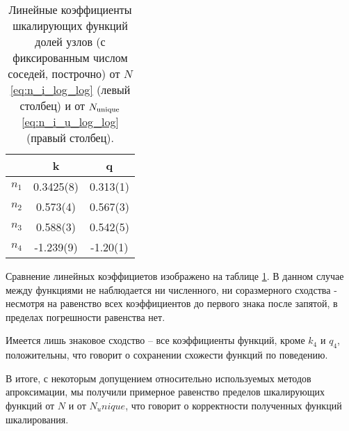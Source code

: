 \begin{table}[h]
\centering
\begin{tabular}{|c|c|c|}
\hline
 & k & q \\ \hline
$n_1$ & 0.3425(8) &  0.313(1) \\ \hline
$n_2$ & 0.573(4) & 0.567(3) \\ \hline
$n_3$ & 0.588(3) & 0.542(5) \\ \hline
$n_4$ & -1.239(9) & -1.20(1) \\ \hline
\end{tabular}
\caption{Линейные коэффициенты шкалирующих функций долей узлов (с фиксированным числом соседей, построчно) от $N$ \eqref{eq:n_i_log_log} (левый столбец) и от $N_{\textup{unique}}$ \eqref{eq:n_i_u_log_log} (правый столбец).}
\label{tab:kq_compare}
\end{table}

Сравнение линейных коэффициетов изображено на таблице \ref{tab:kq_compare}. 
В данном случае между функциями не наблюдается ни численного, ни соразмерного сходства - несмотря на равенство всех коэффициентов до первого знака после запятой, в пределах погрешности равенства нет.

Имеется лишь знаковое сходство -- все коэффициенты функций, кроме $k_4$ и $q_4$, положительны, что говорит о сохранении схожести функций по поведению.

В итоге, с некоторым допущением относительно используемых методов апроксимации, мы получили примерное равенство пределов шкалирующих функций от $N$ и от $N_unique$, что говорит о корректности полученных функций шкалирования.


\newpage